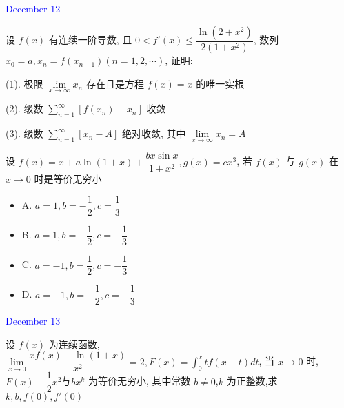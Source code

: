 \begin{solution}
	
\end{solution}


\textcolor{blue}{December 12}

\begin{example}[][Exam: 38.2.9]
	设 $f(x)$ 有连续一阶导数, 且 $0<f'(x)\leq\dfrac{\ln(2+x^{2})}{2(1+x^{2})}$, 数列 $x_{0}=a,x_{n}=f(x_{n-1})(n=1,2,\cdots )$,
	证明:

(1). 极限 $\lim\limits_{x\to \infty}x_{n}$ 存在且是方程 $f(x)=x$ 的唯一实根 

(2). 级数 $\sum\limits_{n=1}^{\infty}\left[f(x_{n})-x_{n}\right]$ 收敛

(3). 级数 $\sum\limits_{n=1}^{\infty}\left[x_{n}-A\right]$ 绝对收敛, 其中 $\lim\limits_{x\to\infty}x_{n}=A$

\end{example}

\begin{solution}
	
\end{solution}

\begin{example}[][Exam: 38.2.10]
	设 $f(x)=x+a\ln(1+x)+\dfrac{bx\sin x}{1+x^{2}},g(x)=cx^{3}$, 若 $f(x)$ 与 $g(x)$ 在 $x\to 0$ 时是等价无穷小
\begin{itemize}
	\item A. $a=1,b=-\dfrac{1}{2},c=\dfrac{1}{3}$ 
	\item B. $a=1,b=-\dfrac{1}{2},c=-\dfrac{1}{3}$
	\item C. $a=-1,b=\dfrac{1}{2},c=-\dfrac{1}{3}$
	\item D. $a=-1,b=-\dfrac{1}{2},c=-\dfrac{1}{3}$
\end{itemize}
\end{example}

\begin{solution}
	
\end{solution}


\textcolor{blue}{December 13}

\begin{example}[][Exam: 38.2.11]
	设 $f(x)$ 为连续函数,$\lim\limits_{x\to 0}\dfrac{xf(x)-\ln(1+x)}{x^{2}}=2, F(x)=\int_{0}^{x}tf(x-t)dt$, 当 $x\to 0$ 时,
	$F(x)-\dfrac{1}{2}x^{2}$与$bx^{k}$ 为等价无穷小, 其中常数 $b\neq 0$,$k$ 为正整数,求 $k,b,f(0),f'(0)$
\end{example}

\begin{solution}
	
\end{solution}

